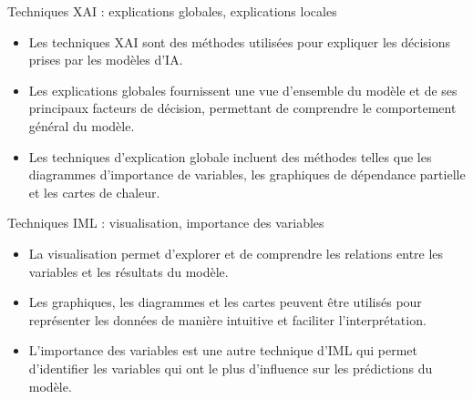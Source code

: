 \documentclass{beamer}
\begin{document}
\begin{frame}{Techniques XAI : explications globales, explications locales}
	\begin{itemize}
		\item Les techniques XAI sont des méthodes utilisées pour expliquer les décisions prises par les modèles d'IA.
		\item Les explications globales fournissent une vue d'ensemble du modèle et de ses principaux facteurs de décision, permettant de comprendre le comportement général du modèle.
		\item Les techniques d'explication globale incluent des méthodes telles que les diagrammes d'importance de variables, les graphiques de dépendance partielle et les cartes de chaleur.
	\end{itemize}
\end{frame}

\begin{frame}{Techniques IML : visualisation, importance des variables}
	\begin{itemize}
		\item La visualisation permet d'explorer et de comprendre les relations entre les variables et les résultats du modèle.
		\item Les graphiques, les diagrammes et les cartes peuvent être utilisés pour représenter les données de manière intuitive et faciliter l'interprétation.
		\item L'importance des variables est une autre technique d'IML qui permet d'identifier les variables qui ont le plus d'influence sur les prédictions du modèle.
	\end{itemize}
\end{frame}
\end{document}
